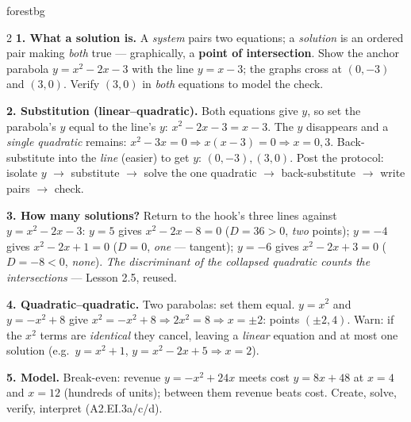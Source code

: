 \documentclass[10pt]{article}
\begin{document}
\begin{skillbox}[Lesson]{forestbg}
\begin{multicols}{2}
\textbf{1. What a solution is.} A \emph{system} pairs two equations; a \emph{solution} is an ordered pair making
\emph{both} true --- graphically, a \textbf{point of intersection}. Show the anchor parabola $y=x^2-2x-3$ with the
line $y=x-3$; the graphs cross at $(0,-3)$ and $(3,0)$. Verify $(3,0)$ in \emph{both} equations to model the check.

\textbf{2. Substitution (linear--quadratic).} Both equations give $y$, so set the parabola's $y$ equal to the
line's $y$: $x^2-2x-3=x-3$. The $y$ disappears and a \emph{single quadratic} remains: $x^2-3x=0\Rightarrow
x(x-3)=0\Rightarrow x=0,3$. Back-substitute into the \emph{line} (easier) to get $y$: $(0,-3),(3,0)$. Post the
protocol: isolate $y$ $\to$ substitute $\to$ solve the one quadratic $\to$ back-substitute $\to$ write pairs $\to$ check.

\columnbreak

\textbf{3. How many solutions?} Return to the hook's three lines against $y=x^2-2x-3$: $y=5$ gives
$x^2-2x-8=0$ ($D=36>0$, \emph{two} points); $y=-4$ gives $x^2-2x+1=0$ ($D=0$, \emph{one} --- tangent);
$y=-6$ gives $x^2-2x+3=0$ ($D=-8<0$, \emph{none}). \emph{The discriminant of the collapsed quadratic counts the
intersections} --- Lesson 2.5, reused.

\textbf{4. Quadratic--quadratic.} Two parabolas: set them equal. $y=x^2$ and $y=-x^2+8$ give $x^2=-x^2+8\Rightarrow
2x^2=8\Rightarrow x=\pm2$: points $(\pm2,4)$. Warn: if the $x^2$ terms are \emph{identical} they cancel, leaving a
\emph{linear} equation and at most one solution (e.g.\ $y=x^2+1$, $y=x^2-2x+5\Rightarrow x=2$).

\textbf{5. Model.} Break-even: revenue $y=-x^2+24x$ meets cost $y=8x+48$ at $x=4$ and $x=12$ (hundreds of units);
between them revenue beats cost. Create, solve, verify, interpret (A2.EI.3a/c/d).
\end{multicols}
\end{skillbox}
\end{document}
